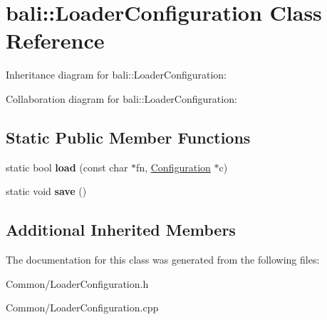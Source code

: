 \hypertarget{classbali_1_1_loader_configuration}{\section{bali\-:\-:Loader\-Configuration Class Reference}
\label{classbali_1_1_loader_configuration}
}


Inheritance diagram for bali\-:\-:Loader\-Configuration\-:


Collaboration diagram for bali\-:\-:Loader\-Configuration\-:
\subsection*{Static Public Member Functions}
\begin{DoxyCompactItemize}
\item 
\hypertarget{classbali_1_1_loader_configuration_a745a072f1c660aa0cec9c4fe2ccfbcb9}{static bool {\bfseries load} (const char $\ast$fn, \hyperlink{classbali_1_1_configuration}{Configuration} $\ast$c)}\label{classbali_1_1_loader_configuration_a745a072f1c660aa0cec9c4fe2ccfbcb9}

\item 
\hypertarget{classbali_1_1_loader_configuration_a1d846589042309bb5f2929b5b46d31a3}{static void {\bfseries save} ()}\label{classbali_1_1_loader_configuration_a1d846589042309bb5f2929b5b46d31a3}

\end{DoxyCompactItemize}
\subsection*{Additional Inherited Members}


The documentation for this class was generated from the following files\-:\begin{DoxyCompactItemize}
\item 
Common/Loader\-Configuration.\-h\item 
Common/Loader\-Configuration.\-cpp\end{DoxyCompactItemize}

